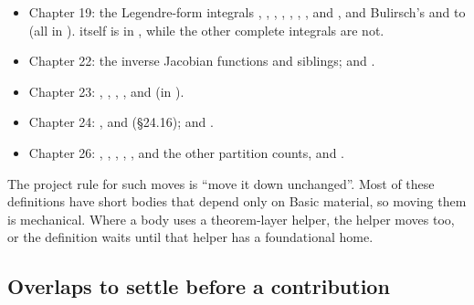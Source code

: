 \documentclass[11pt,a4paper]{article}
\begin{document}
\begin{itemize}
    , ; ,
     and .
  \item Chapter 19: the Legendre-form integrals , ,
    , , , ,
    ,  and , and Bulirsch's
     and  to  (all in
    ).  itself is in
    , while the other complete integrals are not.
  \item Chapter 22: the inverse Jacobian functions  and siblings;
     and .
  \item Chapter 23: , , ,
    ,  and  (in
    ).
  \item Chapter 24: ,  and 
    (§24.16);  and .
  \item Chapter 26: , , ,
    , ,  and the other partition
    counts, and .
\end{itemize}

The project rule for such moves is ``move it down unchanged''. Most of these definitions have
short bodies that depend only on Basic material, so moving them is mechanical. Where a body
uses a theorem-layer helper, the helper moves too, or the definition waits until that helper
has a foundational home.

\subsection{Overlaps to settle before a contribution}
\end{document}
